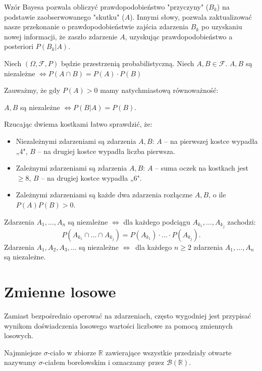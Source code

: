 \documentclass[final,a4paper,openany,12pt]{mwbk}
\begin{document}
Wzór Bayesa pozwala obliczyć prawdopodobieństwo "przyczyny" ($B_k$) na podstawie zaobserwowanego "skutku" ($A$). Innymi słowy, pozwala zaktualizować nasze przekonanie o prawdopodobieństwie zajścia zdarzenia $B_k$ po uzyskaniu nowej informacji, że zaszło zdarzenie $A$, uzyskując prawdopodobieństwo a posteriori $P(B_k|A)$.

\begin{Def}
Niech $(\Omega, \mathcal{F}, P)$ będzie przestrzenią probabilistyczną. Niech $A, B \in \mathcal{F}$. 
$A, B$ są niezależne $\iff P(A \cap B) = P(A) \cdot P(B) $
\end{Def}

Zauważmy, że gdy $P(A) > 0$ mamy natychmiastową równoważność:
\begin{center}
$A, B$ są niezależne $\iff P(B|A) = P(B)$.
\end{center}

\begin{Prz}
    Rzucając dwiema kostkami łatwo sprawdzić, że:
\begin{itemize}
    \item Niezależnymi zdarzeniami są zdarzenia $A, B$: $A$ – na pierwszej kostce wypadła „4", $B$ – na drugiej kostce wypadła liczba pierwsza.
    \item Zależnymi zdarzeniami są zdarzenia $A, B$: $A$ – suma oczek na kostkach jest $\ge 8$, $B$ – na drugiej kostce wypadła „6".
    \item Zależnymi zdarzeniami są każde dwa zdarzenia rozłączne $A, B$, o ile $P(A)P(B) > 0$.
\end{itemize}
\end{Prz}

\begin{Def}
 Zdarzenia $A_1, \dots, A_n$ są niezależne $\iff$ dla każdego podciągu $A_{k_1}, \dots, A_{k_j}$ zachodzi:
\[ P(A_{k_1} \cap \dots \cap A_{k_j}) = P(A_{k_1}) \cdot \dots \cdot P(A_{k_j}). \]
Zdarzenia $A_1, A_2, A_3, \dots$ są niezależne $\iff$\ dla każdego $n \ge 2$ zdarzenia $A_1, \dots, A_n$ są niezależne. 
\end{Def}

\section{Zmienne losowe}
Zamiast bezpośrednio operować na zdarzeniach, często wygodniej jest przypisać wynikom doświadczenia losowego wartości liczbowe za pomocą zmiennych losowych.

\begin{Def}
  Najmniejsze $\sigma$-ciało w zbiorze $\mathbb{R}$ zawierające wszystkie przedziały otwarte nazywamy $\sigma$-ciałem borelowskim i oznaczamy przez $\mathcal{B}(\mathbb{R})$.
\end{Def}
\end{document}
